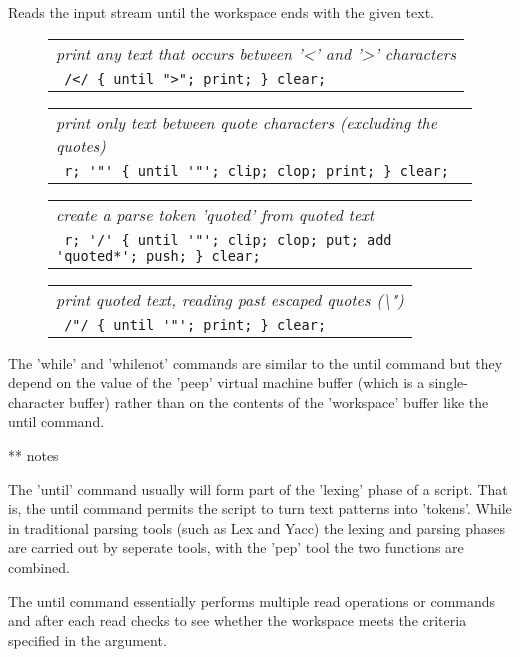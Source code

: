 \documentclass[a4paper,12pt]{article}
\begin{document}
  Reads the input stream until the workspace ends with the given
  text.
 \begin{figure}
 \begin{tabular}{ l }
 \emph{ print any text that occurs between '<' and '>' characters } \\ 
 \verb| /</ { until ">"; print; } clear; |
 \end{tabular} 
 \end{figure}
 \begin{figure}
 \begin{tabular}{ l }
 \emph{ print only text between quote characters (excluding the quotes) } \\ 
 \verb| r; '"' { until '"'; clip; clop; print; } clear; |
 \end{tabular} 
 \end{figure}
 \begin{figure}
 \begin{tabular}{ l }
 \emph{ create a parse token 'quoted' from quoted text } \\ 
 \verb| r; '/' { until '"'; clip; clop; put; add 'quoted*'; push; } clear; |
 \end{tabular} 
 \end{figure}
 \begin{figure}
 \begin{tabular}{ l }
 \emph{ print quoted text, reading past escaped quotes (\textbackslash ") } \\ 
 \verb| /"/ { until '"'; print; } clear; |
 \end{tabular} 
 \end{figure}

  The 'while' and 'whilenot' commands are similar to the until
  command but they depend on the value of the 'peep' virtual
  machine buffer (which is a single-character buffer) rather than
  on the contents of the 'workspace' buffer like the until command.

** notes

  The 'until' command usually will form part of the 'lexing' phase
  of a script. That is, the until command permits the script to
  turn text patterns into 'tokens'. While in traditional parsing tools
  (such as Lex and Yacc) the lexing and parsing phases are carried out
  by seperate tools, with the 'pep' tool the two functions are combined.
  
  The until command essentially performs
  multiple read operations or commands and after each read checks to see
  whether the workspace meets the criteria specified in the argument.
\end{document}
